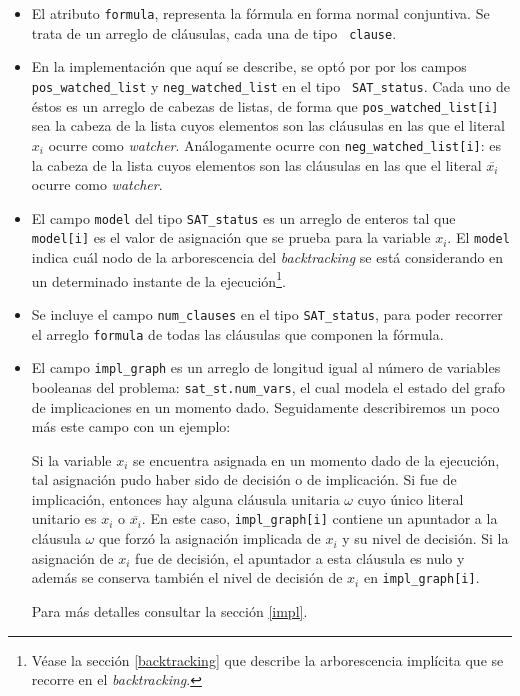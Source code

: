 \documentclass[12pt,lettersize,oneside]{article}
\begin{document}
\begin{itemize}
\item El atributo {\tt formula}, representa la fórmula en forma normal
  conjuntiva. Se trata de un arreglo de cláusulas, cada una de tipo {\tt
    clause}.
\item En la implementación que aquí se describe, se optó por por los campos {\tt
    pos\_watched\_list} y {\tt neg\_watched\_list} en el tipo {\tt
    SAT\_status}. Cada uno de éstos es un arreglo de cabezas de listas, de forma
  que {\tt pos\_watched\_list[i]} sea la cabeza de la lista cuyos elementos son
  las cláusulas en las que el literal $x_i$ ocurre como
  \emph{watcher}. Análogamente ocurre con {\tt neg\_watched\_list[i]}: es la
  cabeza de la lista cuyos elementos son las cláusulas en las que el literal
  $\overline{x_i}$ ocurre como \emph{watcher}.

\item El campo {\tt model} del tipo {\tt SAT\_status} es un arreglo de enteros
  tal que {\tt model[i]} es el valor de asignación que se prueba para la
  variable $x_i$. El {\tt model} indica cuál nodo de la arborescencia del
  \emph{backtracking} se está considerando en un determinado instante de la
  ejecución\footnote{Véase la sección \ref{backtracking} que describe la
    arborescencia implícita que se recorre en el \emph{backtracking}.}.

\item Se incluye el campo {\tt num\_clauses} en el tipo {\tt SAT\_status}, para
  poder recorrer el arreglo {\tt formula} de todas las cláusulas que componen la
  fórmula.

\item El campo {\tt impl\_graph} es un arreglo de longitud igual al número de
  variables booleanas del problema: {\tt sat\_st.num\_vars}, el cual modela el
  estado del grafo de implicaciones en un momento dado. Seguidamente
  describiremos un poco más este campo con un ejemplo:

  Si la variable $x_i$ se encuentra asignada en un momento dado de la ejecución,
  tal asignación pudo haber sido de decisión o de implicación. Si fue de
  implicación, entonces hay alguna cláusula unitaria $\omega$ cuyo único literal
  unitario es $x_i$ o $\overline{x_i}$. En este caso, {\tt impl\_graph[i]}
  contiene un apuntador a la cláusula $\omega$ que forzó la asignación implicada
  de $x_i$ y su nivel de decisión. Si la asignación de $x_i$ fue de decisión, el
  apuntador a esta cláusula es nulo y además se conserva también el nivel de
  decisión de $x_i$ en {\tt impl\_graph[i]}.

  Para más detalles consultar la sección \ref{impl}.
\end{itemize}\vspace{-2.5mm}
\end{document}
